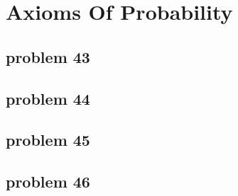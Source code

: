 \section{Axioms Of Probability}

\subsection{problem 43}


\subsection{problem 44}


\subsection{problem 45}


\subsection{problem 46}

